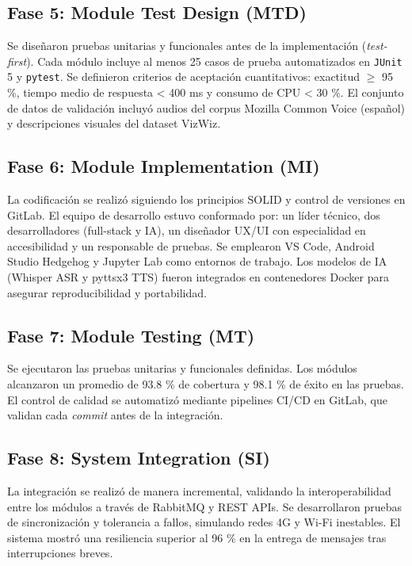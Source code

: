 \documentclass[lettersize,journal]{IEEEtran}
\begin{document}
        \subsection{Fase 5: Module Test Design (MTD)}
        Se diseñaron pruebas unitarias y funcionales antes de la implementación (\textit{test-first}).  
        Cada módulo incluye al menos 25 casos de prueba automatizados en \texttt{JUnit} 5 y \texttt{pytest}.  
        Se definieron criterios de aceptación cuantitativos: exactitud $\geq$ 95 \%, tiempo medio de respuesta < 400 ms y consumo de CPU < 30 \%.  
        El conjunto de datos de validación incluyó audios del corpus Mozilla Common Voice (español) y descripciones visuales del dataset VizWiz.
        
        \subsection{Fase 6: Module Implementation (MI)}
        La codificación se realizó siguiendo los principios SOLID y control de versiones en GitLab.  
        El equipo de desarrollo estuvo conformado por: un líder técnico, dos desarrolladores (full-stack y IA), un diseñador UX/UI con especialidad en accesibilidad y un responsable de pruebas.  
        Se emplearon VS Code, Android Studio Hedgehog y Jupyter Lab como entornos de trabajo.  
        Los modelos de IA (Whisper ASR y pyttsx3 TTS) fueron integrados en contenedores Docker para asegurar reproducibilidad y portabilidad.
        
        \subsection{Fase 7: Module Testing (MT)}
        Se ejecutaron las pruebas unitarias y funcionales definidas.  
        Los módulos alcanzaron un promedio de 93.8 \% de cobertura y 98.1 \% de éxito en las pruebas.  
        El control de calidad se automatizó mediante pipelines CI/CD en GitLab, que validan cada \textit{commit} antes de la integración.
        
        \subsection{Fase 8: System Integration (SI)}
        La integración se realizó de manera incremental, validando la interoperabilidad entre los módulos a través de RabbitMQ y REST APIs.  
        Se desarrollaron pruebas de sincronización y tolerancia a fallos, simulando redes 4G y Wi-Fi inestables.  
        El sistema mostró una resiliencia superior al 96 \% en la entrega de mensajes tras interrupciones breves.
        
\end{document}
